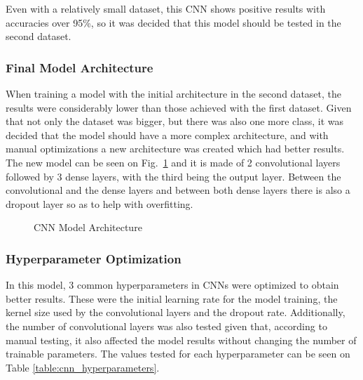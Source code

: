 \kern 0.1cm

Even with a relatively small dataset, this CNN shows positive results with accuracies over 95\%, so it was decided that this model should be tested in the second dataset.

\subsubsection{Final Model Architecture}

When training a model with the initial architecture in the second dataset, the results were considerably lower than those achieved with the first dataset. Given that not only the dataset was bigger, but there was also one more class, it was decided that the model should have a more complex architecture, and with manual optimizations a new architecture was created which had better results. The new model can be seen on Fig.~\ref{fig:cnn_architecture} and it is made of 2 convolutional layers followed by 3 dense layers, with the third being the output layer. Between the convolutional and the dense layers and between both dense layers there is also a dropout layer so as to help with overfitting.

\begin{figure}[H]%
    \centering
    
    \caption[CNN Architecture]{CNN Model Architecture}
    \label{fig:cnn_architecture}
\end{figure}


\subsubsection{Hyperparameter Optimization}

In this model, 3 common hyperparameters in CNNs were optimized to obtain better results. These were the initial learning rate for the model training, the kernel size used by the convolutional layers and the dropout rate. Additionally, the number of convolutional layers was also tested given that, according to manual testing, it also affected the model results without changing the number of trainable parameters. The values tested for each hyperparameter can be seen on Table \ref{table:cnn_hyperparameters}.

